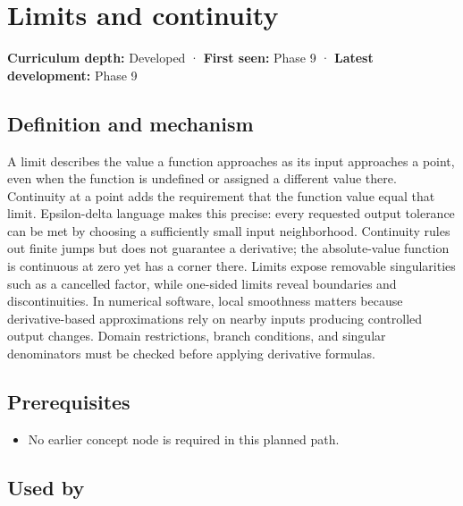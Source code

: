 \hypertarget{appendix-fecc1847f5a3}{}\label{referencestart:appendix-fecc1847f5a3}
\section{Limits and continuity}\label{appendix-fecc1847f5a3-limits-and-continuity}

\textbf{Curriculum depth:} Developed · \textbf{First seen:} Phase 9 · \textbf{Latest development:} Phase 9

\begin{allmightroledefinition}

\subsection{Definition and mechanism}\label{appendix-fecc1847f5a3-definition-and-mechanism}

A limit describes the value a function approaches as its input approaches a point, even when the function is undefined or assigned a different value there. Continuity at a point adds the requirement that the function value equal that limit. Epsilon-delta language makes this precise: every requested output tolerance can be met by choosing a sufficiently small input neighborhood. Continuity rules out finite jumps but does not guarantee a derivative; the absolute-value function is continuous at zero yet has a corner there. Limits expose removable singularities such as a cancelled factor, while one-sided limits reveal boundaries and discontinuities. In numerical software, local smoothness matters because derivative-based approximations rely on nearby inputs producing controlled output changes. Domain restrictions, branch conditions, and singular denominators must be checked before applying derivative formulas.

\end{allmightroledefinition}

\subsection{Prerequisites}\label{appendix-fecc1847f5a3-prerequisites}

\begin{itemize}
\tightlist
\item
  No earlier concept node is required in this planned path.
\end{itemize}

\subsection{Used by}\label{appendix-fecc1847f5a3-used-by}

